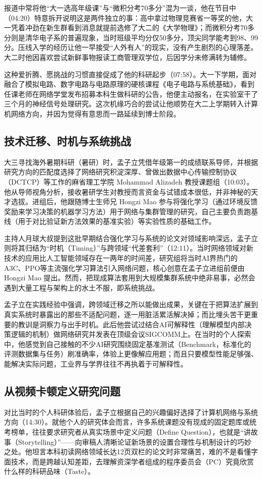 \documentclass[UTF8,a4paper,11pt,fontset=fandol]{ctexart}
\begin{document}
报道中常将他“大一选高年级课”与“微积分考70多分”混为一谈，他在节目中（04:20）特意拆开说明这是两件独立的事：高中拿过物理竞赛省一等奖的他，大一凭着冲劲在新生群看到消息就提前选修了大二的《大学物理》；而微积分考70多分则是清华电子系的普遍现象，当时班级平均分仅50多分，顶尖同学能考到98、99分。压线入学的经历让他一早接受“人外有人”的现实，没有产生剧烈的心理落差。大二时他因喜欢尝试新鲜事物报读工商管理双学位，后因学分未修满转为辅修。

这种爱折腾、愿挑战的习惯直接促成了他的科研起步（07:58）。大一下学期，面对融合了模拟电路、数字电路与电路原理的硬核课程《电子电路与系统基础》，看到任课老师在网络学堂发布招募本科生做科研的公告，他便主动报名，在实验室干了三个月的神经信号处理研究。这次机缘巧合的尝试让他顺势在大二上学期转入计算机网络方向，并因为觉得有意思而一路延续到博士阶段。

\subsection{技术迁移、时机与系统挑战}
大三寻找海外暑期科研（暑研）时，孟子立凭借年级第一的成绩联系导师，并根据研究方向的匹配度选择了网络研究积淀深厚、曾做出数据中心传输控制协议（DCTCP）等工作的麻省理工学院 Mohammad Alizadeh 教授课题组（10:03）。他从导师视角分析，接收暑研学生对教授而言资金与试错成本很低，并非神秘的天才选拔。进组后，他跟随博士生师兄 Hongzi Mao 参与将强化学习（通过环境反馈奖励来学习决策的机器学习方法）用于网络与集群管理的研究，自己主要负责跑基线（用于对比验证新方法效果的基准实验）等实验性质的基础工作。

主持人月球大叔提到这批早期结合强化学习与系统的论文对领域影响深远，孟子立则将其归结为“时机（Timing）”与跨领域“代差套利”（12:11）。当时网络领域对新技术的应用比人工智能领域存在一两年的时间差，研究组将当时AI界热门的A3C、PPO等主流强化学习算法引入网络问题，核心创意在孟子立进组前便由 Hongzi Mao 提出。然而，把现成算法套用到大规模集群系统中绝非易事，必然会遇到大量工程与架构上的水土不服，即系统挑战。

孟子立在实践经验中强调，跨领域迁移之所以能做出成果，关键在于把算法扩展到真实系统时暴露出的那些不适配问题，逐一用脏活累活解决掉；而比埋头苦干更重要的教训是洞察力与出手时机。此后他尝试过结合AI可解释性（理解模型内部决策逻辑的机制）做网络研究并发表在顶级会议SIGCOMM上。在当时的个人探索中，他感觉到自己接触的不少AI研究围绕固定基准测试（Benchmark，标准化的评测数据集与任务）刷准确率，体验上更像解应用题；而且只要模型性能足够强、能解决实际问题，工业界与学界往往不再执着于可解释性。

\subsection{从视频卡顿定义研究问题}
对比当时的个人科研体验后，孟子立根据自己的兴趣偏好选择了计算机网络与系统方向（14:30）。就他个人的研究体会而言，许多系统课题没有现成的固定题库或统考榜单，往往要求研究者从真实场景中定义问题（Define Question），也就是“讲故事（Storytelling）”——向审稿人清晰论证新场景的设置合理性与机制设计的巧妙之处。他坦言本科初读网络领域长达12页双栏的论文时非常痛苦，难的不是看懂字面技术，而是跨越认知差距，去理解资深学者组成的程序委员会（PC）究竟欣赏什么样的科研品味（Taste）。
\end{document}
